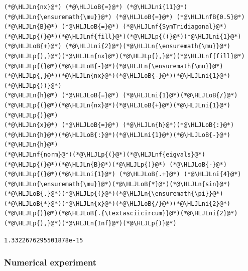 \documentclass[12pt,a4paper]{article}
\newcommand{\HLJLn}[1]{#1}
\newcommand{\HLJLnf}[1]{\textcolor[RGB]{66,102,213}{#1}}
\newcommand{\HLJLnfB}[1]{\textcolor[RGB]{59,151,46}{#1}}
\newcommand{\HLJLni}[1]{\textcolor[RGB]{59,151,46}{#1}}
\newcommand{\HLJLoB}[1]{\textcolor[RGB]{102,102,102}{\textbf{#1}}}
\newcommand{\HLJLp}[1]{#1}
\begin{document}
\begin{lstlisting}
(*@\HLJLn{nx}@*) (*@\HLJLoB{=}@*) (*@\HLJLni{11}@*)
(*@\HLJLn{\ensuremath{\mu}}@*) (*@\HLJLoB{=}@*) (*@\HLJLnfB{0.5}@*)
(*@\HLJLn{B}@*) (*@\HLJLoB{=}@*) (*@\HLJLnf{SymTridiagonal}@*)(*@\HLJLp{(}@*)(*@\HLJLnf{fill}@*)(*@\HLJLp{((}@*)(*@\HLJLni{1}@*) (*@\HLJLoB{+}@*) (*@\HLJLni{2}@*)(*@\HLJLn{\ensuremath{\mu}}@*)(*@\HLJLp{),}@*)(*@\HLJLn{nx}@*)(*@\HLJLp{),}@*)(*@\HLJLnf{fill}@*)(*@\HLJLp{(}@*)(*@\HLJLoB{-}@*)(*@\HLJLn{\ensuremath{\mu}}@*)(*@\HLJLp{,}@*)(*@\HLJLn{nx}@*)(*@\HLJLoB{-}@*)(*@\HLJLni{1}@*)(*@\HLJLp{))}@*)
(*@\HLJLn{h}@*) (*@\HLJLoB{=}@*) (*@\HLJLni{1}@*)(*@\HLJLoB{/}@*)(*@\HLJLp{(}@*)(*@\HLJLn{nx}@*)(*@\HLJLoB{+}@*)(*@\HLJLni{1}@*)(*@\HLJLp{)}@*)
(*@\HLJLn{x}@*) (*@\HLJLoB{=}@*) (*@\HLJLn{h}@*)(*@\HLJLoB{:}@*)(*@\HLJLn{h}@*)(*@\HLJLoB{:}@*)(*@\HLJLni{1}@*)(*@\HLJLoB{-}@*)(*@\HLJLn{h}@*)
(*@\HLJLnf{norm}@*)(*@\HLJLp{(}@*)(*@\HLJLnf{eigvals}@*)(*@\HLJLp{(}@*)(*@\HLJLn{B}@*)(*@\HLJLp{)}@*) (*@\HLJLoB{-}@*) (*@\HLJLp{(}@*)(*@\HLJLni{1}@*) (*@\HLJLoB{.+}@*) (*@\HLJLni{4}@*)(*@\HLJLn{\ensuremath{\mu}}@*)(*@\HLJLoB{*}@*)(*@\HLJLn{sin}@*)(*@\HLJLoB{.}@*)(*@\HLJLp{(}@*)(*@\HLJLn{\ensuremath{\pi}}@*)(*@\HLJLoB{*}@*)(*@\HLJLn{x}@*)(*@\HLJLoB{/}@*)(*@\HLJLni{2}@*)(*@\HLJLp{)}@*)(*@\HLJLoB{.{\textasciicircum}}@*)(*@\HLJLni{2}@*)(*@\HLJLp{),}@*)(*@\HLJLn{Inf}@*)(*@\HLJLp{)}@*)
\end{lstlisting}

\begin{lstlisting}
1.3322676295501878e-15
\end{lstlisting}


\subsubsection{Numerical experiment}
\end{document}
